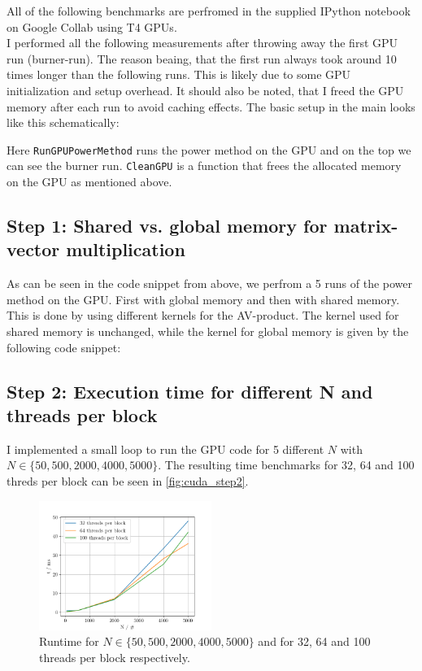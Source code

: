 All of the following benchmarks are perfromed in the supplied IPython notebook on Google Collab using T4 GPUs.\\ 

I performed all the following measurements after throwing away the first GPU run (burner-run). The reason beaing, that the first run always took around 10 times longer than the following runs. This is likely due to some GPU initialization and setup overhead. It should also be noted, that I freed the GPU memory after each run to avoid caching effects. The basic setup in the main looks like this schematically: 

Here \texttt{RunGPUPowerMethod} runs the power method on the GPU and on the top we can see the burner run. \texttt{CleanGPU} is a function that frees the allocated memory on the GPU as mentioned above.\\


\subsection{Step 1: Shared vs. global memory for matrix-vector multiplication}
As can be seen in the code snippet from above, we perfrom a 5 runs of the power method on the GPU. First with global memory and then with shared memory. This is done by using different kernels for the AV-product. The kernel used for shared memory is unchanged, while the kernel for global memory is given by the following code snippet: 
\subsection{Step 2: Execution time for different N and threads per block}
I implemented a small loop to run the GPU code for 5 different $N$ with $N \in \{50, 500, 2000, 4000, 5000\}$. The resulting time benchmarks for 32, 64 and 100 threds per block can be seen in \autoref{fig:cuda_step2}. 
\begin{figure}[H]
    \centering
    \includegraphics[width=0.5\textwidth]{../fig/lab3/step2.png}
    \caption{Runtime for $N \in \{50, 500, 2000, 4000, 5000\}$ and for 32, 64 and 100 threads per block respectively.}
    \label{fig:cuda_step2}
\end{figure}
